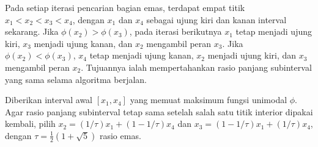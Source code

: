 \begin{remark} Pada setiap iterasi pencarian bagian emas, terdapat empat titik $x_1<x_2<x_3<x_4$, dengan $x_1$ dan $x_4$ sebagai ujung kiri dan kanan interval sekarang. Jika $\phi(x_2)>\phi(x_3)$, pada iterasi berikutnya $x_1$ tetap menjadi ujung kiri, $x_3$ menjadi ujung kanan, dan $x_2$ mengambil peran $x_3$. Jika $\phi(x_2)<\phi(x_3)$, $x_4$ tetap menjadi ujung kanan, $x_2$ menjadi ujung kiri, dan $x_3$ mengambil peran $x_2$. Tujuannya ialah mempertahankan rasio panjang subinterval yang sama selama algoritma berjalan.
\end{remark}

\begin{proposition} Diberikan interval awal $[x_1,x_4]$ yang memuat maksimum fungsi unimodal $\phi$. Agar rasio panjang subinterval tetap sama setelah salah satu titik interior dipakai kembali, pilih
$x_2=(1/\tau)x_1+(1-1/\tau)x_4$ dan $x_3=(1-1/\tau)x_1+(1/\tau)x_4$, dengan $\tau=\tfrac12(1+\sqrt5)$ rasio emas.
\end{proposition}
